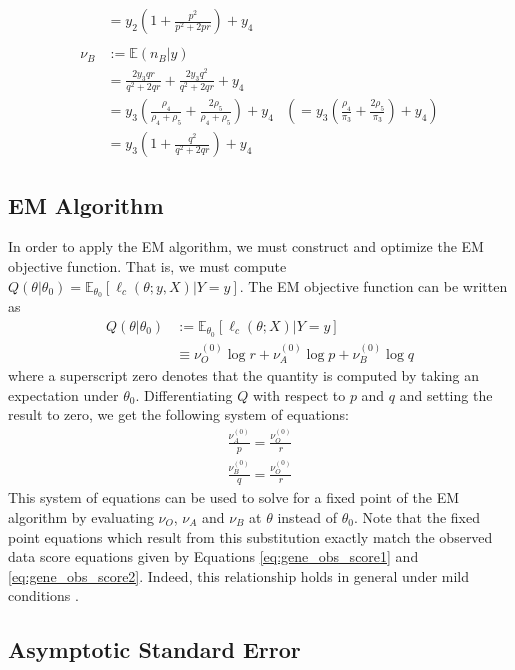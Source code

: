 \documentclass[11pt, oneside]{article}   	%
\newcommand{\bE}{\mathbb{E}}
\begin{document}
\begin{appendices}
\begin{align}
        &= y_2 \left( 1 + \frac{p^2}{p^2 + 2pr} \right) + y_4\\
        \nonumber \\
        \nu_B &:= \bE(n_B|y)\\
        &= \frac{2 y_3 qr}{q^2 + 2qr} + \frac{2y_3 q^2}{q^2 + 2qr} + y_4\\
        &= y_3 \left( \frac{\rho_4}{\rho_4 + \rho_5} + \frac{2\rho_5}{\rho_4 + \rho_5} \right) + y_4 &\left(= y_3 \left( \frac{\rho_4}{\pi_3} + \frac{2\rho_5}{\pi_3} \right) + y_4 \right)\\
        &= y_3 \left( 1 + \frac{q^2}{q^2 + 2qr} \right) + y_4
    \end{align}


    \subsection{EM Algorithm}
    \label{app:EM}

    In order to apply the EM algorithm, we must construct and optimize the EM objective function. That is, we must compute $Q(\theta|\theta_0) = \bE_{\theta_0} \left[ \ell_c(\theta; y, X) | Y=y \right]$. The EM objective function can be written as
    \begin{align}
		Q(\theta | \theta_0) &:= \bE_{\theta_0} [\ell_c (\theta; X) | Y=y]\\
		&\equiv \nu_O^{(0)} \log r + \nu_A^{(0)} \log p + \nu_B^{(0)} \log q
	\end{align}
    where a superscript zero denotes that the quantity is computed by taking an expectation under $\theta_0$. Differentiating $Q$ with respect to $p$ and $q$ and setting the result to zero, we get the following system of equations:
    \begin{align}
        \frac{\nu_A^{(0)}}{p} = \frac{\nu_O^{(0)}}{r} \label{eq:blood_update1}\\
        \frac{\nu_B^{(0)}}{q} = \frac{\nu_O^{(0)}}{r} \label{eq:blood_update2}
    \end{align}
    This system of equations can be used to solve for a fixed point of the EM algorithm by evaluating $\nu_O$, $\nu_A$ and $\nu_B$ at $\theta$ instead of $\theta_0$. Note that the fixed point equations which result from this substitution exactly match the observed data score equations given by Equations \ref{eq:gene_obs_score1} and \ref{eq:gene_obs_score2}. Indeed, this relationship holds in general under mild conditions \citep{Wu83}.

    \subsection{Asymptotic Standard Error}
    \label{app:ASE}


\end{appendices}
\end{document}
